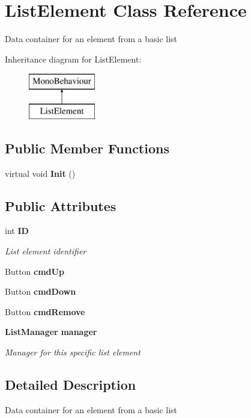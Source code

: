 \section{List\+Element Class Reference}
\label{class_list_element}


Data container for an element from a basic list  


Inheritance diagram for List\+Element\+:\begin{figure}[H]
\begin{center}
\leavevmode
\includegraphics[height=2.000000cm]{class_list_element}
\end{center}
\end{figure}
\subsection*{Public Member Functions}
\begin{DoxyCompactItemize}
\item 
virtual void \textbf{ Init} ()
\end{DoxyCompactItemize}
\subsection*{Public Attributes}
\begin{DoxyCompactItemize}
\item 
int \textbf{ ID}
\begin{DoxyCompactList}\small\item\em List element identifier \end{DoxyCompactList}\item 
Button \textbf{ cmd\+Up}
\item 
Button \textbf{ cmd\+Down}
\item 
Button \textbf{ cmd\+Remove}
\item 
\textbf{ List\+Manager} \textbf{ manager}
\begin{DoxyCompactList}\small\item\em Manager for this specific list element \end{DoxyCompactList}\end{DoxyCompactItemize}


\subsection{Detailed Description}
Data container for an element from a basic list 




